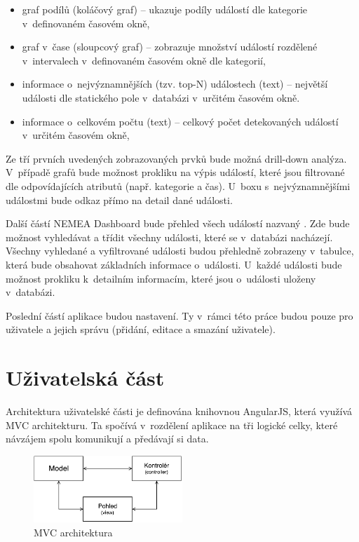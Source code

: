 \begin{itemize}
    \item graf podílů (koláčový graf) -- ukazuje podíly událostí dle kategorie v~definovaném časovém okně,
    \item graf v~čase (sloupcový graf) -- zobrazuje množství událostí rozdělené v~intervalech v~definovaném časovém okně dle kategorií,
    \item informace o~nejvýznamnějších (tzv. top-N) událostech (text) -- největší události dle statického pole v~databázi v~určitém časovém okně.
    \item informace o~celkovém počtu (text) -- celkový počet detekovaných událostí v~určitém časovém okně,
\end{itemize}

Ze tří prvních uvedených zobrazovaných prvků bude možná drill-down analýza. V~případě grafů bude možnost prokliku na výpis událostí, které jsou filtrované dle odpovídajících atributů (např. kategorie a čas). U~boxu s~nejvýznamnějšími událostmi bude odkaz přímo na detail dané události.

Další částí NEMEA Dashboard bude přehled všech událostí nazvaný . Zde bude možnost vyhledávat a třídit všechny události, které se v~databázi nacházejí. Všechny vyhledané a vyfiltrované události budou přehledně zobrazeny v~tabulce, která bude obsahovat základních informace o~události. U~každé události bude možnost prokliku k~detailním informacím, které jsou o~události uloženy v~databázi.

Poslední částí aplikace budou nastavení. Ty v~rámci této práce budou pouze pro uživatele a jejich správu (přidání, editace a smazání uživatele).

\section{Uživatelská část}
\label{sec:mvc}
Architektura uživatelské části je definována knihovnou AngularJS, která využívá MVC architekturu. Ta spočívá v~rozdělení aplikace na tři logické celky, které návzájem spolu komunikují a předávají si data.

\begin{figure}[ht]
    \centering
    \includegraphics[width=0.5\textwidth]{fig/mvc.pdf}
    \caption{MVC architektura} \label{fig:mvc}
\end{figure}

